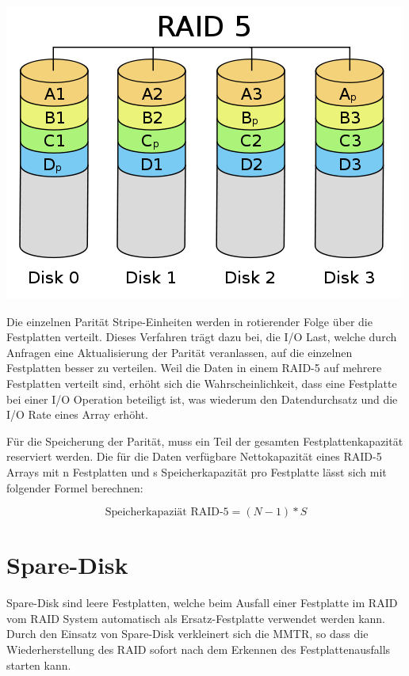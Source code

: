 \begin{center}
\includegraphics[width=\linewidth, keepaspectratio = true]{media/Raid-5.png}
\end{center}

Die einzelnen Parität Stripe-Einheiten werden in rotierender Folge über die Festplatten verteilt. Dieses Verfahren trägt dazu bei, die I/O Last, welche durch Anfragen eine Aktualisierung der Parität veranlassen, auf die einzelnen Festplatten besser zu verteilen. Weil die Daten in einem RAID-5 auf mehrere Festplatten verteilt sind, erhöht sich die Wahrscheinlichkeit, dass eine Festplatte bei einer I/O Operation beteiligt ist, was wiederum den Datendurchsatz und die I/O Rate eines Array erhöht. \cite{Kuratti1995}

Für die Speicherung der Parität, muss ein Teil der gesamten Festplattenkapazität reserviert werden. Die für die Daten verfügbare Nettokapazität eines RAID-5 Arrays mit n Festplatten und s Speicherkapazität pro Festplatte lässt sich mit folgender Formel \cite{Kuratti1995} berechnen:

\begin{equation}
\mbox{Speicherkapaziät RAID-5}=(N-1)*S
\label{eqn:MaxSpeicherkapazitätRAID5}
\end{equation}
 
\section{Spare-Disk}
Spare-Disk sind leere Festplatten, welche beim Ausfall einer Festplatte im RAID vom RAID System automatisch als Ersatz-Festplatte verwendet werden kann. Durch den Einsatz von Spare-Disk verkleinert sich die MMTR, so dass die Wiederherstellung des RAID sofort nach dem Erkennen des Festplattenausfalls starten kann. 

